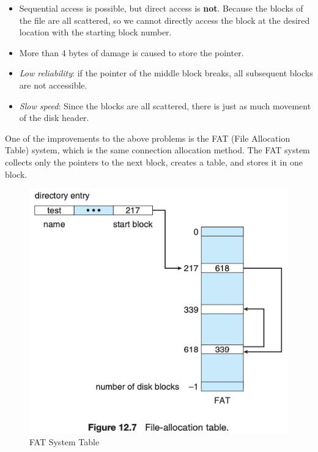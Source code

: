 \documentclass{homework}
\begin{document}
\begin{itemize}
    \item Sequential access is possible, but direct access is \textbf{not}. Because the blocks of the file are all scattered, so we cannot directly access the block at the desired location with the starting block number.
    \item More than 4 bytes of damage is caused to store the pointer.
    \item \textit{Low reliability}: if the pointer of the middle block breaks, all subsequent blocks are not accessible.
    \item \textit{Slow speed}: Since the blocks are all scattered, there is just as much movement of the disk header.
\end{itemize}

One of the improvements to the above problems is the FAT (File Allocation Table) system, which is the same connection allocation method. The FAT system collects only the pointers to the next block, creates a table, and stores it in one block.

\begin{figure}[h]
\begin{center}
\includegraphics[scale=0.7]{40.png}    
\caption{FAT System Table}
\end{center}
\end{figure}
\end{document}
